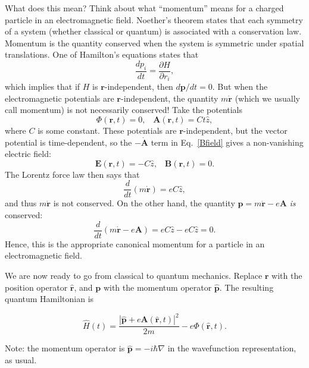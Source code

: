 \documentclass[pra,12pt]{revtex4}
\begin{document}
What does this mean?  Think about what ``momentum'' means for a
charged particle in an electromagnetic field.  Noether's theorem
states that each symmetry of a system (whether classical or quantum)
is associated with a conservation law.  Momentum is the quantity
conserved when the system is symmetric under spatial translations.
One of Hamilton's equations states that
\begin{equation*}
  \frac{dp_i}{dt} = \frac{\partial H}{\partial r_i},
\end{equation*}
which implies that if $H$ is $\mathbf{r}$-independent, then
$d\mathbf{p}/dt = 0$.  But when the electromagnetic potentials are
$\mathbf{r}$-independent, the quantity $m\dot{\mathbf{r}}$ (which we
usually call momentum) is not necessarily conserved!  Take the
potentials
\begin{equation}
  \Phi(\mathbf{r}, t) = 0, \;\;\; \mathbf{A}(\mathbf{r}, t) = Ct \hat{z},
\end{equation}
where $C$ is some constant.  These potentials are
$\mathbf{r}$-independent, but the vector potential is time-dependent,
so the $-\dot{\mathbf{A}}$ term in Eq.~\eqref{Bfield} gives a
non-vanishing electric field:
\begin{equation}
  \mathbf{E}(\mathbf{r},t) = - C\hat{z}, \;\;\;\mathbf{B}(\mathbf{r},t) = 0.
\end{equation}
The Lorentz force law then says that
\begin{equation}
  \frac{d}{dt}(m\dot{\mathbf{r}}) = eC\hat{z},
\end{equation}
and thus $m\dot{\mathbf{r}}$ is not conserved.  On the other hand, the
quantity $\mathbf{p} = m\dot{\mathbf{r}} - e \mathbf{A}$ \textit{is}
conserved:
\begin{equation}
  \frac{d}{dt}(m\dot{\mathbf{r}} - e\mathbf{A}) =
  eC\hat{z} - eC\hat{z} = 0.
\end{equation}
Hence, this is the appropriate canonical momentum for a particle in an
electromagnetic field.

We are now ready to go from classical to quantum mechanics.  Replace
$\mathbf{r}$ with the position operator $\hat{\mathbf{r}}$, and
$\mathbf{p}$ with the momentum operator $\hat{\mathbf{p}}$.  The
resulting quantum Hamiltonian is
\begin{framed}
  \begin{equation}
    \hat{H}(t) = \frac{|\hat{\mathbf{p}}+e\mathbf{A}(\hat{\mathbf{r}},t)|^2}{2m}
    - e\Phi(\hat{\mathbf{r}},t).
    \label{quantumH}
  \end{equation}
\end{framed}
\vskip -0.15in
\noindent
Note: the momentum operator is $\hat{\mathbf{p}} = -i\hbar\nabla$
in the wavefunction representation, as usual.
\end{document}

